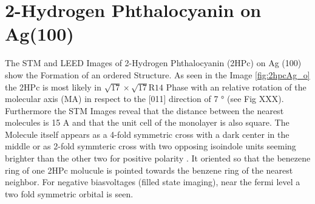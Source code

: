 \section{2-Hydrogen Phthalocyanin on Ag(100)}
\label{sec:results}The STM and LEED Images of 2-Hydrogen Phthalocyanin (2HPc) on Ag (100) show the Formation of an ordered Structure.
As seen in the Image \ref{fig:2hpcAg_o} the 2HPc  is most likely in $\sqrt{17} \times  \sqrt{17}\text{R}14$ Phase with an relative rotation of the molecular axis (MA) in respect to the [011] direction of 7 ° (see Fig XXX). 
Furthermore the STM Images reveal that the distance between the nearest molecules is 
15 A and that the unit cell of the monolayer is also square.
\noindent The Molecule itself appears as a 4-fold symmetric cross with a dark center in the middle or as 2-fold symmteric cross with two opposing isoindole units seeming brighter than the other two for positive polarity . 
It oriented so that the benezene ring of one 2HPc molucule is pointed towards the benzene ring of the nearest neighbor. 
For negative biasvoltages (filled state imaging), near the fermi level a two fold symmetric orbital is seen. 

